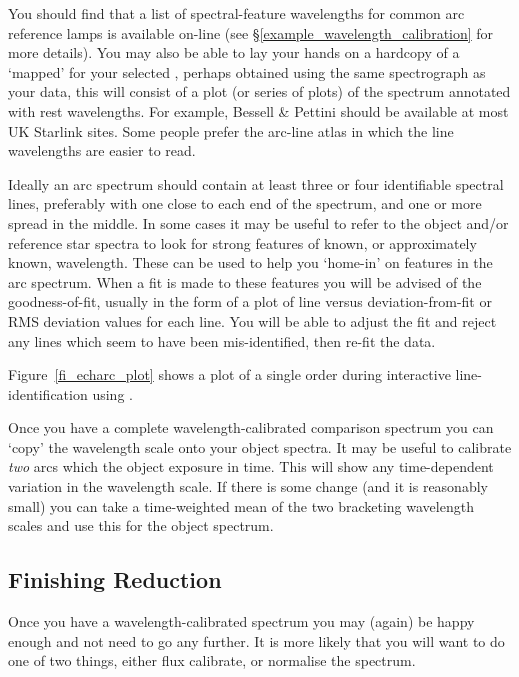 \documentclass[twoside,11pt]{starlink}
\providecommand{\mlabel}[1]{\xlabel{#1}\label{#1}}
\providecommand{\scspec}[2]{#1}
\begin{document}
\mlabel{atlases}
You should find that a list of spectral-feature wavelengths for
common arc reference lamps is available on-line (see
\scspec{\S\ref{example_wavelength_calibration}}{the \xref{worked
example}{example_wavelength_calibration}} for more details).
You may also be able to lay your hands on a hardcopy of a `mapped'
 for your selected
,  perhaps obtained using
the same spectrograph as your data, this will consist of a plot
(or series of plots) of the spectrum annotated with rest wavelengths.
For example, Bessell \& Pettini\cite{echref} should be available
at most UK Starlink sites.
Some people prefer the  arc-line atlas\cite{eso_main}
in which the line wavelengths are easier to read.

Ideally an arc spectrum should contain at least three or four
identifiable spectral lines, preferably with one close to each
end of the spectrum, and one or more spread in the middle.
In some cases it may be useful to refer to the object and/or reference star
spectra to look for strong features of known, or approximately known,
wavelength.
These can be used to help you `home-in' on features in the arc spectrum.
When a fit is made to these features you will be advised of the
goodness-of-fit, usually in the form of a plot of line versus
deviation-from-fit or RMS deviation values for each line.
You will be able to adjust the fit and reject any lines which
seem to have been mis-identified, then re-fit the data.

\scspec{Figure~\ref{fi_echarc_plot}}{The figure above} shows a plot of a
single order during interactive line-identification using
.

Once you have a complete wavelength-calibrated comparison spectrum you
can `copy' the wavelength scale onto your object spectra.
It may be useful to calibrate \emph{two} arcs which
 the object exposure in time.
This will show any time-dependent variation in the wavelength scale.
If there is some change (and it is reasonably small) you can
take a time-weighted mean of the two bracketing wavelength scales and use
this for the object spectrum.


\subsection{\mlabel{finishing}Finishing Reduction}

Once you have a wavelength-calibrated spectrum you may (again)
be happy enough and not need to go any further.
It is more likely that you will want to do one of two things,
either flux calibrate, or normalise the spectrum.
\end{document}
